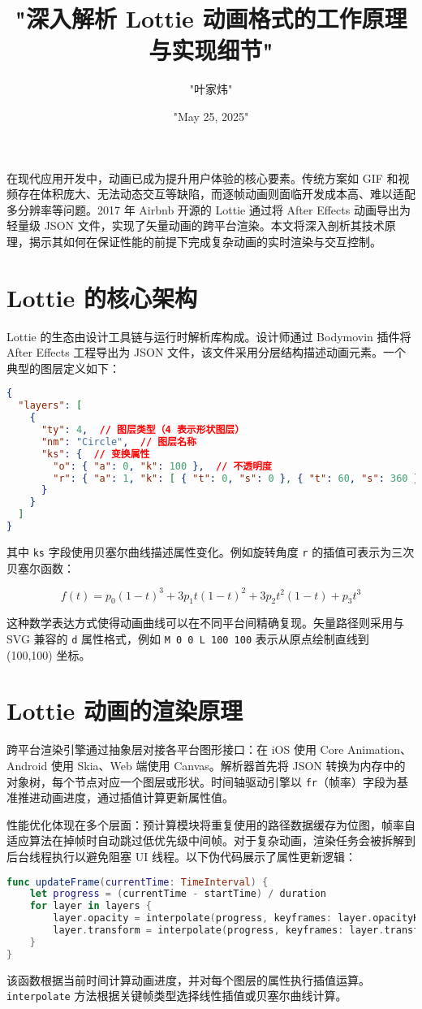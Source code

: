 \title{"深入解析 Lottie 动画格式的工作原理与实现细节"}
\author{"叶家炜"}
\date{"May 25, 2025"}
\maketitle
在现代应用开发中，动画已成为提升用户体验的核心要素。传统方案如 GIF 和视频存在体积庞大、无法动态交互等缺陷，而逐帧动画则面临开发成本高、难以适配多分辨率等问题。2017 年 Airbnb 开源的 Lottie 通过将 After Effects 动画导出为轻量级 JSON 文件，实现了矢量动画的跨平台渲染。本文将深入剖析其技术原理，揭示其如何在保证性能的前提下完成复杂动画的实时渲染与交互控制。\par
\chapter{Lottie 的核心架构}
Lottie 的生态由设计工具链与运行时解析库构成。设计师通过 Bodymovin 插件将 After Effects 工程导出为 JSON 文件，该文件采用分层结构描述动画元素。一个典型的图层定义如下：\par
\begin{lstlisting}[language=json]
{
  "layers": [
    {
      "ty": 4,  // 图层类型（4 表示形状图层）
      "nm": "Circle",  // 图层名称
      "ks": {  // 变换属性
        "o": { "a": 0, "k": 100 },  // 不透明度
        "r": { "a": 1, "k": [ { "t": 0, "s": 0 }, { "t": 60, "s": 360 } ] }  // 旋转动画
      }
    }
  ]
}
\end{lstlisting}
其中 \verb!ks! 字段使用贝塞尔曲线描述属性变化。例如旋转角度 \verb!r! 的插值可表示为三次贝塞尔函数：\par
$$ f(t) = p_0(1 - t)^3 + 3p_1t(1 - t)^2 + 3p_2t^2(1 - t) + p_3t^3 $$\par
这种数学表达方式使得动画曲线可以在不同平台间精确复现。矢量路径则采用与 SVG 兼容的 \verb!d! 属性格式，例如 \verb!M 0 0 L 100 100! 表示从原点绘制直线到 (100,100) 坐标。\par
\chapter{Lottie 动画的渲染原理}
跨平台渲染引擎通过抽象层对接各平台图形接口：在 iOS 使用 Core Animation、Android 使用 Skia、Web 端使用 Canvas。解析器首先将 JSON 转换为内存中的对象树，每个节点对应一个图层或形状。时间轴驱动引擎以 \verb!fr!（帧率）字段为基准推进动画进度，通过插值计算更新属性值。\par
性能优化体现在多个层面：预计算模块将重复使用的路径数据缓存为位图，帧率自适应算法在掉帧时自动跳过低优先级中间帧。对于复杂动画，渲染任务会被拆解到后台线程执行以避免阻塞 UI 线程。以下伪代码展示了属性更新逻辑：\par
\begin{lstlisting}[language=swift]
func updateFrame(currentTime: TimeInterval) {
    let progress = (currentTime - startTime) / duration
    for layer in layers {
        layer.opacity = interpolate(progress, keyframes: layer.opacityKeyframes)
        layer.transform = interpolate(progress, keyframes: layer.transformKeyframes)
    }
}
\end{lstlisting}
该函数根据当前时间计算动画进度，并对每个图层的属性执行插值运算。\verb!interpolate! 方法根据关键帧类型选择线性插值或贝塞尔曲线计算。\par
